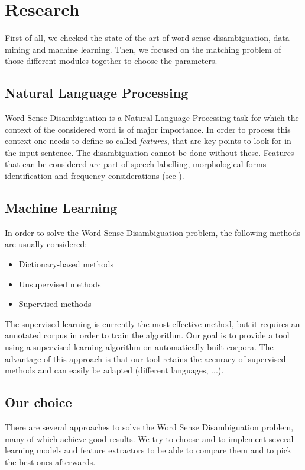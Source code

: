\documentclass[11pt,a4paper]{article}
\begin{document}
\section{Research}

First of all, we checked the state of the art of word-sense disambiguation, data mining and machine learning. Then, we focused on the matching problem of those different modules together to choose the parameters.
 
\subsection{Natural Language Processing}
Word Sense Disambiguation is a Natural Language Processing task for which the context of the considered word is of major importance. In order to process this context one needs to define so-called \textit{features}, that are key points to look for in the input sentence. The disambiguation cannot be done without these. Features that can be considered are part-of-speech labelling, morphological forms identification and frequency considerations (see \cite{features}). 


\subsection{Machine Learning}
In order to solve the Word Sense Disambiguation problem, the following methods are usually considered:
\begin{itemize}
    \item Dictionary-based methods
    \item Unsupervised methods
    \item Supervised methods
\end{itemize}
The supervised learning is currently the most effective method, but it requires an annotated corpus in order to train the algorithm. Our goal is to provide a tool using a supervised learning algorithm on automatically built corpora. The advantage of this approach is that our tool retains the accuracy of supervised methods and can easily be adapted (different languages, ...).

\subsection{Our choice}
There are several approaches to solve the Word Sense Disambiguation problem, many of which achieve good results. We try to choose and to implement several learning models and feature extractors to be able to compare them and to pick the best ones afterwards.
\end{document}
